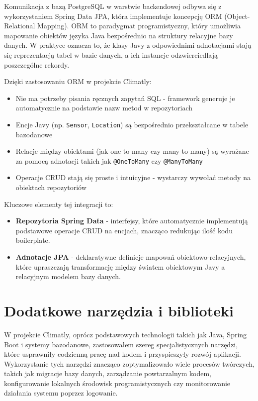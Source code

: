 \documentclass[a4paper,12pt,openany]{book}
\begin{document}
Komunikacja z bazą PostgreSQL w warstwie backendowej odbywa się z wykorzystaniem Spring Data JPA, która implementuje koncepcję ORM (Object-Relational Mapping). ORM to paradygmat programistyczny, który umożliwia mapowanie obiektów języka Java bezpośrednio na struktury relacyjne bazy danych. W praktyce oznacza to, że klasy Javy z odpowiednimi adnotacjami stają się reprezentacją tabel w bazie danych, a ich instancje odzwierciedlają poszczególne rekordy.

Dzięki zastosowaniu ORM w projekcie Climatly:
\begin{itemize}[noitemsep,topsep=2pt]
\item Nie ma potrzeby pisania ręcznych zapytań SQL - framework generuje je automatycznie na podstawie nazw metod w repozytoriach
\item Encje Javy (np. \texttt{Sensor}, \texttt{Location}) są bezpośrednio przekształcane w tabele bazodanowe
\item Relacje między obiektami (jak one-to-many czy many-to-many) są wyrażane za pomocą adnotacji takich jak \texttt{@OneToMany} czy \texttt{@ManyToMany}
\item Operacje CRUD stają się proste i intuicyjne - wystarczy wywołać metody na obiektach repozytoriów
\end{itemize}

Kluczowe elementy tej integracji to:
\begin{itemize}[noitemsep,topsep=2pt]
\item \textbf{Repozytoria Spring Data} - interfejsy, które automatycznie implementują podstawowe operacje CRUD na encjach, znacząco redukując ilość kodu boilerplate.
\item \textbf{Adnotacje JPA} - deklaratywne definicje mapowań obiektowo-relacyjnych, które upraszczają transformację między światem obiektowym Javy a relacyjnym modelem bazy danych.
\end{itemize}


\section{Dodatkowe narzędzia i biblioteki}

W projekcie Climatly, oprócz podstawowych technologii takich jak Java, Spring Boot i systemy bazodanowe, zastosowałem szereg specjalistycznych narzędzi, które usprawniły codzienną pracę nad kodem i przyspieszyły rozwój aplikacji. Wykorzystanie tych narzędzi znacząco zoptymalizowało wiele procesów twórczych, takich jak migracje bazy danych, zarządzanie powtarzalnym kodem, konfigurowanie lokalnych środowisk programistycznych czy monitorowanie działania systemu poprzez logowanie.
\end{document}
